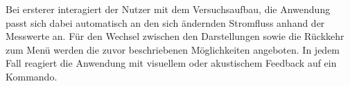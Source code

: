 Bei ersterer interagiert der Nutzer mit dem Versuchsaufbau, die Anwendung passt sich dabei automatisch an den sich ändernden Stromfluss anhand der Messwerte an. Für den Wechsel zwischen den Darstellungen sowie die Rückkehr zum Menü werden die zuvor beschriebenen Möglichkeiten angeboten. In jedem Fall reagiert die Anwendung mit visuellem oder akustischem Feedback auf ein Kommando.\\


